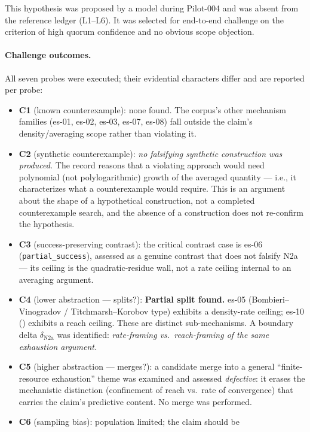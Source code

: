 \documentclass[11pt]{article}
\theoremstyle{gowthm}
\theoremstyle{gowplain}
\begin{document}
This hypothesis was proposed by a model during Pilot-004 and was absent from
the reference ledger (L1--L6). It was selected for end-to-end challenge on the
criterion of high quorum confidence and no obvious scope objection.

\paragraph{Challenge outcomes.}
All seven probes were executed; their evidential characters differ and are
reported per probe:
\begin{itemize}[nosep]
  \item \textbf{C1} (known counterexample): none found. The corpus's other
    mechanism families (es-01, es-02, es-03, es-07, es-08) fall outside the
    claim's density/averaging scope rather than violating it.
  \item \textbf{C2} (synthetic counterexample): \emph{no falsifying synthetic
    construction was produced.} The record reasons that a violating approach
    would need polynomial (not polylogarithmic) growth of the averaged
    quantity --- i.e., it characterizes what a counterexample would require.
    This is an argument about the shape of a hypothetical construction, not a
    completed counterexample search, and the absence of a construction does
    not re-confirm the hypothesis.
  \item \textbf{C3} (success-preserving contrast): the critical contrast case
    is es-06 (\texttt{partial\_success}), assessed as a genuine contrast that
    does not falsify N2a --- its ceiling is the quadratic-residue wall, not a
    rate ceiling internal to an averaging argument.
  \item \textbf{C4} (lower abstraction --- splits?): \textbf{Partial split found.}
    es-05 (Bombieri--Vinogradov / Titchmarsh--Korobov type) exhibits a
    density-rate ceiling; es-10 ()
    exhibits a reach ceiling. These are distinct sub-mechanisms. A boundary
    delta $\delta_{\text{N2a}}$ was identified: \emph{rate-framing vs.\
    reach-framing of the same exhaustion argument.}
  \item \textbf{C5} (higher abstraction --- merges?): a candidate merge into a
    general ``finite-resource exhaustion'' theme was examined and assessed
    \emph{defective}: it erases the mechanistic distinction (confinement of
    reach vs.\ rate of convergence) that carries the claim's predictive
    content. No merge was performed.
  \item \textbf{C6} (sampling bias): population limited; the claim should be

\end{itemize}
\end{document}
